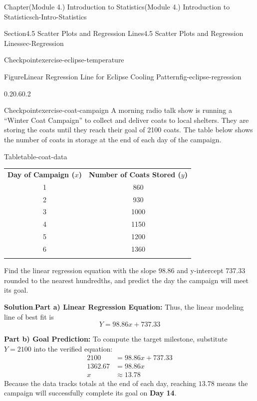 \documentclass[oneside,10pt,]{book}
\newcommand{\blocktitlefont}{\relax}
\newcommand{\tabularfont}{\relax}
\newcommand{\terminology}[1]{\textbf{#1}}
\newcommand{\hrulethin}  {\noalign{\hrule height 0.04em}}
\newcommand{\amp}{&}
\begin{document}
\begin{chapterptx}{Chapter}{(Module 4.) Introduction to Statistics}{}{(Module 4.) Introduction to Statistics}{}{}{ch-Intro-Statistics}
\begin{sectionptx}{Section}{4.5 Scatter Plots and Regression Lines}{}{4.5 Scatter Plots and Regression Lines}{}{}{sec-Regression}
\begin{inlineexercise}{Checkpoint}{}{exercise-eclipse-temperature}
\begin{figureptx}{Figure}{Linear Regression Line for Eclipse Cooling Pattern}{fig-eclipse-regression}{}
\begin{image}{0.2}{0.6}{0.2}{}
{%
}%
\end{image}%
\tcblower
\end{figureptx}%
\end{inlineexercise}%
\begin{inlineexercise}{Checkpoint}{}{exercise-coat-campaign}%
A morning radio talk show is running a \textquotedblleft{}Winter Coat Campaign\textquotedblright{} to collect and deliver coats to local shelters. They are storing the coats until they reach their goal of 2100 coats. The table below shows the number of coats in storage at the end of each day of the campaign.%
\begin{tableptx}{Table}{\textbf{}}{table-coat-data}{}%
\centering%
{\tabularfont%
\begin{tabular}{cc}\hrulethin
{\bfseries{}\terminology{Day of Campaign (\(x\))}}&{\bfseries{}\terminology{Number of Coats Stored (\(y\))}}\tabularnewline\hrulethin
1&860\tabularnewline\hrulethin
2&930\tabularnewline\hrulethin
3&1000\tabularnewline\hrulethin
4&1150\tabularnewline\hrulethin
5&1200\tabularnewline\hrulethin
6&1360\tabularnewline\hrulethin
\end{tabular}
}%
\end{tableptx}%
Find the linear regression equation with the slope 98.86 and y-intercept 737.33 rounded to the nearest hundredths, and predict the day the campaign will meet its goal.%
\par\smallskip%
\noindent\textbf{\blocktitlefont Solution}.\hypertarget{exercise-coat-campaign-2}{}\quad{}\terminology{Part a) Linear Regression Equation:} Thus, the linear modeling line of best fit is%
\begin{equation*}
Y = 98.86x + 737.33
\end{equation*}
%
\par
\terminology{Part b) Goal Prediction:} To compute the target milestone, substitute \(Y = 2100\) into the verified equation:%
\begin{align*}
2100 \amp = 98.86x + 737.33\\
1362.67 \amp = 98.86x\\
x \amp \approx 13.78
\end{align*}
Because the data tracks totals at the end of each day, reaching \(13.78\) means the campaign will successfully complete its goal on \terminology{Day 14}.%

\end{inlineexercise}
\end{sectionptx}
\end{chapterptx}
\end{document}
